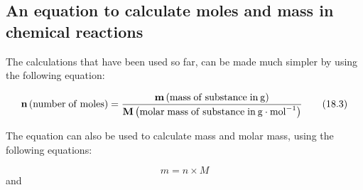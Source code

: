             \subsection*{An equation to calculate moles and mass in chemical reactions}
            \nopagebreak
      \label{m38717*id277432}The calculations that have been used so far, can be made much simpler by using the following equation:\par 
      \label{m38717*id277436}\nopagebreak\noindent{}
    \begin{equation}
    \mathbf{n}\left(\mathrm{number\; of\; moles}\right)=\frac{\mathbf{m}\left(\mathrm{mass\; of\; substance\; in}\phantom{\rule{2pt}{0ex}}\mathrm{g}\right)}{\mathbf{M}\left(\mathrm{molar\; mass\; of\; substance\; in}\phantom{\rule{2pt}{0ex}}\mathrm{g}\ensuremath{\cdot}{\mathrm{mol}}^{-1}\right)}\tag{18.3}
      \end{equation}
\label{m38717*notfhsst!!!underscore!!!id374}
	\par
      \label{m38717*id277555}The equation can also be used to calculate mass and molar mass, using the following equations:\par 
      \label{m38717*id277559}\nopagebreak\noindent{}
        
    \begin{equation}
    m=n\ensuremath{\times}M\tag{18.4}
      \end{equation}
      \label{m38717*id277579}and\par 
      \label{m38717*id277584}\nopagebreak\noindent{}
        
